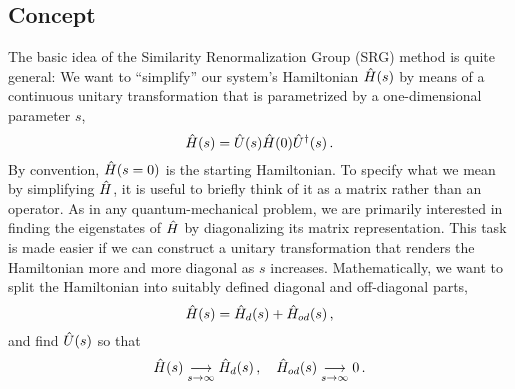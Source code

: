 \subsection{Concept}
The basic idea of the Similarity Renormalization Group (SRG) method is 
quite general: We want to ``simplify'' our system's Hamiltonian
$\hat{H}(s)$ by means of a continuous unitary transformation that is parametrized
by a one-dimensional parameter $s$,
\begin{equation}\label{eq:cut}
  \HO(s)=\UO(s)\HO(0)\UUO(s)\,.
\end{equation}
By convention, $\hat{H}(s=0)$ is the starting Hamiltonian. To specify what we mean by 
simplifying $\hat{H}$, it is useful to briefly think of it as a matrix rather than an 
operator. As in any quantum-mechanical problem, we are primarily interested in 
finding the eigenstates of $\hat{H}$ by diagonalizing its matrix representation. This task 
is made easier if we can construct a unitary transformation that renders the Hamiltonian 
more and more diagonal as $s$ increases. Mathematically, we want to split the Hamiltonian 
into suitably defined diagonal and off-diagonal parts,
\begin{equation}
  \hat{H}(s) = \hat{H}_d(s) + \hat{H}_{od}(s)\,,
\end{equation}
and find $\hat{U}(s)$ so that
\begin{equation}\label{eq:trafo_goal}
  \HO(s)\underset{s\to\infty}{\longrightarrow}\HO_d(s)\,,\quad \HO_{od}(s)\underset{s\to\infty}{\longrightarrow} 0\,.
\end{equation}

